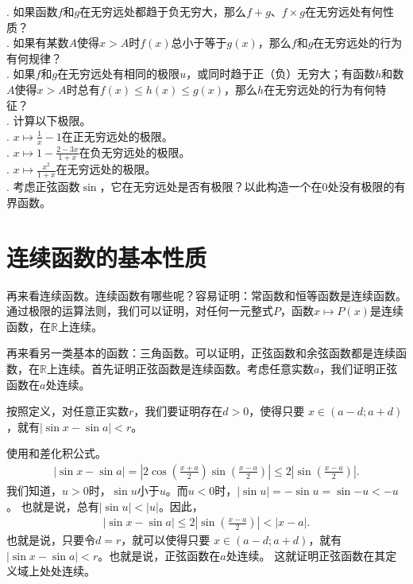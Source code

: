 \documentclass[12pt,UTF8,fontset=none]{ctexbook}
\begin{document}
\begin{xt}
    . 如果函数$f$和$g$在无穷远处都趋于负无穷大，那么$f + g$、$f \times g$在无穷远处有何性质？\\
    . 如果有某数$A$使得$x>A$时$f(x)$总小于等于$g(x)$，那么$f$和$g$在无穷远处的行为有何规律？\\
    . 如果$f$和$g$在无穷远处有相同的极限$u$，或同时趋于正（负）无穷大；有函数$h$和数$A$使得$x>A$时总有$f(x)\leqslant h(x)\leqslant g(x)$，那么$h$在无穷远处的行为有何特征？\\
    . 计算以下极限。\\
    . $x\mapsto \displaystyle \frac{1}{x} - 1$在正无穷远处的极限。\\
    . $x\mapsto \displaystyle 1 - \frac{2 - 3x}{1 + x}$在负无穷远处的极限。\\
    . $x\mapsto \displaystyle\frac{x^2}{1 + x}$在无穷远处的极限。\\
    . 考虑正弦函数$\sin$，它在无穷远处是否有极限？以此构造一个在$0$处没有极限的有界函数。
\end{xt}

\section{连续函数的基本性质}

再来看连续函数。连续函数有哪些呢？容易证明：常函数和恒等函数是连续函数。通过极限的运算法则，我们可以证明，对任何一元整式$P$，函数$x\mapsto P(x)$是连续函数，在$\mathbb{R}$上连续。

再来看另一类基本的函数：三角函数。可以证明，正弦函数和余弦函数都是连续函数，在$\mathbb{R}$上连续。首先证明正弦函数是连续函数。考虑任意实数$a$，我们证明正弦函数在$a$处连续。

按照定义，对任意正实数$r$，我们要证明存在$d>0$，使得只要
$x\in(a-d;a+d)$，就有$|\sin{x} - \sin{a}| < r$。

使用和差化积公式。
\begin{align*}
    |\sin{x} - \sin{a}| = \left|2\cos\left(\frac{x+a}{2}\right)\sin\left(\frac{x-a}{2}\right)\right| \leqslant 2 \left|\sin\left(\frac{x-a}{2}\right)\right|. 
\end{align*}
我们知道，$u>0$时，$\sin{u}$小于$u$。而$u<0$时，$|\sin{u}| = -\sin{u} = \sin{-u} < -u$。
也就是说，总有$|\sin{u}| < |u|$。因此，
\begin{align*}
    |\sin{x} - \sin{a}| \leqslant 2 \left|\sin\left(\frac{x-a}{2}\right)\right| <  \left|x-a\right|. 
\end{align*}
也就是说，只要令$d = r$，就可以使得只要
$x\in(a-d;a+d)$，就有$|\sin{x} - \sin{a}| < r$。也就是说，正弦函数在$a$处连续。
这就证明正弦函数在其定义域上处处连续。
\end{document}
